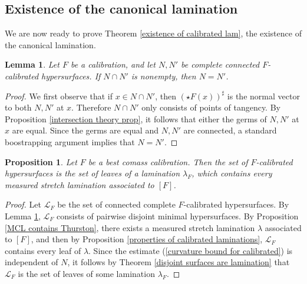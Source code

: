 \documentclass[reqno,11pt]{amsart}
\newtheorem{lemma}[theorem]{Lemma}
\newtheorem{proposition}[theorem]{Proposition}
\theoremstyle{definition}
\numberwithin{equation}{section}
\begin{document}
\subsection{Existence of the canonical lamination}
We are now ready to prove Theorem \ref{existence of calibrated lam}, the existence of the canonical lamination.
\begin{lemma}\label{calibrated implies disjoint}
Let $F$ be a calibration, and let $N, N'$ be complete connected $F$-calibrated hypersurfaces.
If $N \cap N'$ is nonempty, then $N = N'$.
\end{lemma}
\begin{proof}
We first observe that if $x \in N \cap N'$, then $(\star F(x))^\sharp$ is the normal vector to both $N, N'$ at $x$.
Therefore $N \cap N'$ only consists of points of tangency.
By Proposition \ref{intersection theory prop}, it follows that either the germs of $N, N'$ at $x$ are equal.
Since the germs are equal and $N, N'$ are connected, a standard boostrapping argument implies that $N = N'$.
\end{proof}

\begin{proposition}\label{existence of semicanonical lamination}
Let $F$ be a best comass calibration.
Then the set of $F$-calibrated hypersurfaces is the set of leaves of a lamination $\lambda_F$, which contains every measured stretch lamination associated to $[F]$.
\end{proposition}
\begin{proof}
Let $\mathscr L_F$ be the set of connected complete $F$-calibrated hypersurfaces.
By Lemma \ref{calibrated implies disjoint}, $\mathscr L_F$ consists of pairwise disjoint minimal hypersurfaces.
By Proposition \ref{MCL contains Thurston}, there exists a measured stretch lamination $\lambda$ associated to $[F]$, and then by Proposition \ref{properties of calibrated laminations}, $\mathscr L_F$ contains every leaf of $\lambda$.
Since the estimate (\ref{curvature bound for calibrated}) is independent of $N$, it follows by Theorem \ref{disjoint surfaces are lamination} that $\mathscr L_F$ is the set of leaves of some lamination $\lambda_F$.
\end{proof}
\end{document}
